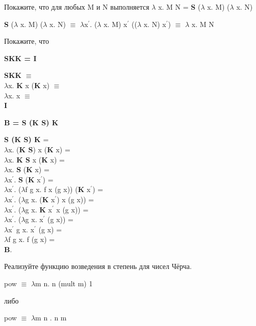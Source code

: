 \documentclass[a4paper,12pt]{article} %
\begin{document}
\begin{enumerate}
\begin{enumerate}
\end{enumerate}

{\item Покажите, что для любых M и N выполняется $\lambda$ x. M N = \textbf{S} ($\lambda$ x. M) ($\lambda$ x. N)}

    \begin{adjustwidth}{1em}{0pt}
    \textbf{S} ($\lambda$ x. M) ($\lambda$ x. N) $\equiv$ $\lambda$x$^\prime$. ($\lambda$ x. M) x$^\prime$ (($\lambda$ x. N) x$^\prime$) $\equiv$ $\lambda$ x. M N
    \end{adjustwidth}


{\item Покажите, что}

\begin{enumerate}

{\item \textbf{SKK = I}}

    \textbf{SKK} $\equiv$ \\
    $\lambda$x. \textbf{K} x (\textbf{K} x) $\equiv$ \\
    $\lambda$x. x $\equiv$ \\
    \textbf{I}


{\item \textbf{B = S (K S) K}}

    \textbf{S (K S) K} = \\
    $\lambda$x. (\textbf{K S}) x (\textbf{K} x) = \\
    $\lambda$x. \textbf{K S} x (\textbf{K} x) = \\
    $\lambda$x. \textbf{S} (\textbf{K} x) = \\
    $\lambda$x$^\prime$. \textbf{S} (\textbf{K} x$^\prime$) = \\
    $\lambda$x$^\prime$. ($\lambda$f g x. f x (g x)) (\textbf{K} x$^\prime$) = \\
    $\lambda$x$^\prime$. ($\lambda$g x. (\textbf{K} x$^\prime$) x (g x))  = \\
    $\lambda$x$^\prime$. ($\lambda$g x. \textbf{K} x$^\prime$ x (g x))  = \\
    $\lambda$x$^\prime$. ($\lambda$g x. x$^\prime$ (g x))  = \\
    $\lambda$x$^\prime$ g x. x$^\prime$ (g x) = \\
    $\lambda$f g x. f (g x) = \\
	\textbf{B}.

\end{enumerate}

{\item Реализуйте функцию возведения в степень для чисел Чёрча.}

    \begin{adjustwidth}{1em}{0pt}
    pow $\equiv$ $\lambda$m n. n (mult m) 1
    
    либо
    
    pow $\equiv$ $\lambda$m n . n m
    \end{adjustwidth}

\end{enumerate}
\end{document}
